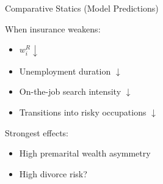 \documentclass[aspectratio=169, 11pt]{beamer}
\begin{document}
\begin{frame}{Comparative Statics (Model Predictions)}

When insurance weakens:

\begin{itemize}
    \item $w_i^R \downarrow$
    \item Unemployment duration $\downarrow$
    \item On-the-job search intensity $\downarrow$
    \item Transitions into risky occupations $\downarrow$
\end{itemize}

\vspace{1.5em}
Strongest effects:
\begin{itemize}
    \item High premarital wealth asymmetry
    \item High divorce risk?
\end{itemize}

\end{frame}
\end{document}
